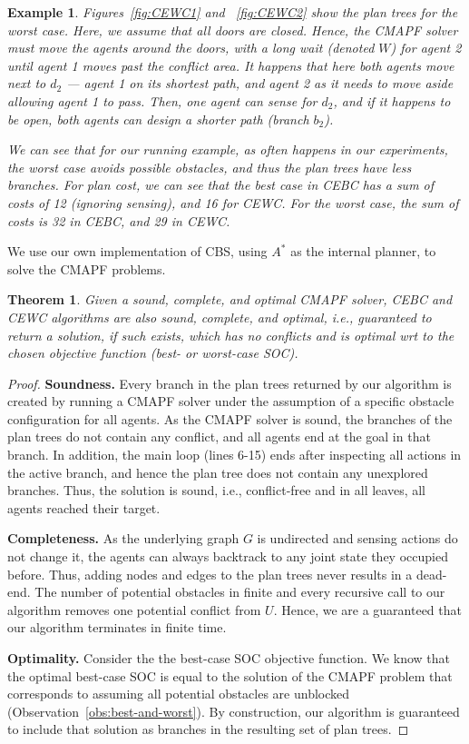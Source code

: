 \documentclass[letterpaper]{article} %
\newtheorem{exmp}{Example}
\newtheorem{theorem}{Theorem}
\begin{document}
\begin{exmp}
Figures~\ref{fig:CEWC1} and ~\ref{fig:CEWC2} show the plan trees for the worst case. Here, we assume that all doors are closed. Hence, the CMAPF solver must move the agents around the doors, with a long wait (denoted $W$) for agent 2 until agent 1 moves past the conflict area. It happens that here both agents move next to $d_2$ --- agent 1 on its shortest path, and agent 2 as it needs to move aside allowing agent 1 to pass. Then, one agent can sense for $d_2$, and if it happens to be open, both agents can design a shorter path (branch $b_2$).

We can see that for our running example, as often happens in our experiments, the worst case avoids possible obstacles, and thus the plan trees have less branches. For plan cost, we can see that the best case in CEBC has a sum of costs of 12 (ignoring sensing), and 16 for CEWC. For the worst case, the sum of costs is 32 in CEBC, and 29 in CEWC.
\end{exmp}


We use our own implementation of CBS, using $A^*$ as the internal planner, to solve the CMAPF problems.


\begin{theorem}
Given a sound, complete, and optimal CMAPF solver, CEBC and CEWC algorithms are also sound, complete, and optimal, i.e., guaranteed to return a solution, if such exists, which has no conflicts and is optimal wrt to the chosen objective function (best- or worst-case SOC).
\end{theorem}

\begin{proof}
\noindent \textbf{Soundness.}
Every branch in the plan trees returned by our algorithm is created by running a CMAPF solver under the assumption of a specific obstacle configuration for all agents. 
As the CMAPF solver is sound, the branches of the plan trees do not contain any conflict, and all agents end at the goal in that branch. In addition, the main loop (lines 6-15) ends after inspecting all actions in the active branch, and hence the plan tree does not contain any unexplored branches. 
Thus, the solution is sound, i.e., conflict-free and in all leaves, all agents reached their target.

\noindent\textbf{Completeness.} 
As the underlying graph $G$ is undirected and sensing actions do not change it, the agents can always backtrack to any joint state they occupied before. Thus, adding nodes and edges to the plan trees never results in a dead-end. 
The number of potential obstacles in finite and every recursive call to our algorithm removes one potential conflict from $U$. Hence, we are a guaranteed that our algorithm terminates in finite time. 

\noindent\textbf{Optimality.} Consider the the best-case SOC objective function. We know that the optimal best-case SOC is equal to the solution of the CMAPF problem that corresponds to assuming all potential obstacles are unblocked (Observation~\ref{obs:best-and-worst}). By construction, our algorithm is guaranteed to include that solution as branches in the resulting set of plan trees. 
\end{proof}
\end{document}
